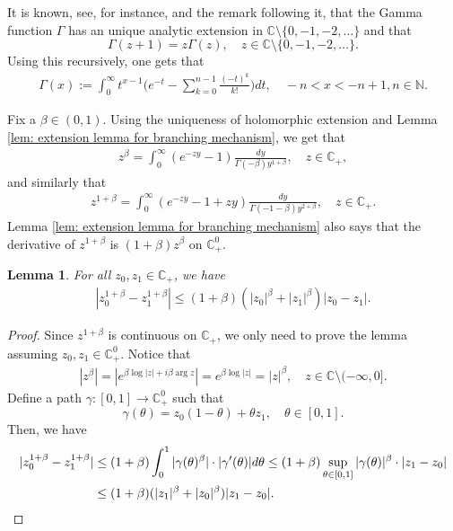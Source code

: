 \documentclass[12pt,a4paper]{amsart}
\theoremstyle{plain}
\newtheorem{lem}[thm]{Lemma}
\theoremstyle{definition}
\numberwithin{equation}{section}
\begin{document}
It is known, see, for instance, \cite[Theorem 6.1.3]{SteinShakarchi2003Complex} and the remark following it, that the Gamma function $\Gamma$ has an unique analytic extension in $\mathbb C\setminus\{0, -1,-2,\dots\}$ and that
\[
	\Gamma(z+1) 
  = z \Gamma(z),\quad z\in \mathbb C\setminus\{0, -1,-2,\dots\}.
\]
Using this recursively, one gets that
\begin{align}
  \label{eq: definition of Gamma function}
  \Gamma(x)
  := \int_0^\infty t^{x-1} \Big(e^{-t} - \sum_{k=0}^{n-1} \frac{(-t)^k}{k!}\Big) dt,
  \quad -n< x< -n+1, n\in \mathbb N.
\end{align}

Fix a $\beta \in (0,1)$.
Using the uniqueness of holomorphic extension and Lemma \ref{lem: extension lemma for branching mechanism}, we get that
\begin{align}
  z^{\beta}
	= \int_0^\infty (e^{-zy}-1) \frac{dy}{\Gamma(-\beta)y^{1+\beta}},
  \quad z\in \mathbb C_+,
\end{align}
and similarly that
\begin{align}
  \label{eq: stable branching on C+}
  z^{1+\beta}
  = \int_0^\infty (e^{-zy}-1+zy)\frac{dy}{\Gamma(-1-\beta)y^{2+\beta}},
  \quad z\in \mathbb C_+.
\end{align}
Lemma \ref{lem: extension lemma for branching mechanism} also says that the derivative of $z^{1+\beta}$ is $(1+\beta)z^{\beta}$ on $\mathbb C^0_+$.
\begin{lem}
  \label{lem: Lip of power function}
  For all $z_0,z_1 \in \mathbb C_+$, we have
\begin{align}
  \label{eq: Lip of power function}
  |z_0^{1+\beta} - z_1^{1+\beta}|
  \leq (1+\beta)(|z_0|^{\beta}+|z_1|^{\beta})|z_0 - z_1|.
\end{align}
\end{lem}
\begin{proof}
  Since $z^{1+\beta}$ is continuous on $\mathbb C_+$, we only need to prove the lemma assuming $z_0,z_1 \in \mathbb C^0_+$.
  Notice that
  \begin{align}
    \label{eq: upper bound for beta power of z}
    |z^\beta|
    = |e^{\beta \log |z| +i\beta \operatorname {arg}z}| = e^{\beta \log |z|} = |z|^\beta,
    \quad z \in \mathbb C\setminus (-\infty, 0].
  \end{align}
  Define a path $\gamma: [0,1] \to \mathbb C^0_+$ such that
  \[
    \gamma(\theta)
    = z_0 (1-\theta) + \theta z_1,
    \quad \theta \in [0,1].
  \]
  Then, we have
  \begin{align}
    |z_0^{1+\beta} - z_1^{1+\beta}|
    & \leq (1+\beta) \int_0^1 |\gamma(\theta)^{\beta}|\cdot |\gamma'(\theta)|d\theta
      \leq (1+\beta)  \sup_{\theta \in [0,1]} |\gamma(\theta)|^{\beta} \cdot |z_1-z_0| \\
    & \leq (1+\beta)  ( |z_1|^{\beta}+|z_0|^{\beta} ) |z_1-z_0|.
      \qedhere
  \end{align}
\end{proof}
\end{document}
